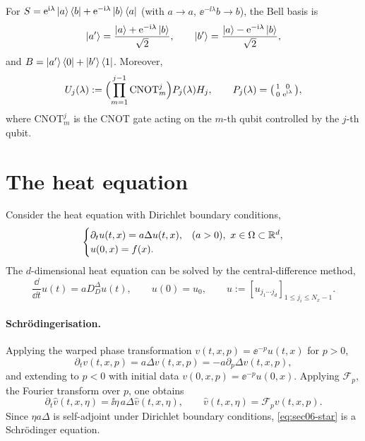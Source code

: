 \begin{remark}
For $S = \mathrm{e}^{\mathrm{i}\lambda}\ket{a}\bra{b} + \mathrm{e}^{-\mathrm{i}\lambda}\ket{b}\bra{a}$
(with $a \to a$, $\ee^{-\ii\lambda}b \to b$), the Bell basis is
\begin{equation}
  \ket{a'} = \frac{\ket{a} + \mathrm{e}^{-\mathrm{i}\lambda}\ket{b}}{\sqrt{2}}, \qquad
  \ket{b'} = \frac{\ket{a} - \mathrm{e}^{-\mathrm{i}\lambda}\ket{b}}{\sqrt{2}},
\end{equation}
and $B = \ket{a'}\bra{0} + \ket{b'}\bra{1}$. Moreover,
\begin{equation}
  U_j(\lambda) := \Bigl(\prod_{m=1}^{j-1} \mathrm{CNOT}_m^j\Bigr) P_j(\lambda) H_j, \qquad
  P_j(\lambda) = \begin{psmallmatrix} 1 & 0 \\ 0 & \mathrm{e}^{\mathrm{i}\lambda} \end{psmallmatrix},
\end{equation}
where $\mathrm{CNOT}_m^j$ is the CNOT gate acting on the $m$-th qubit controlled by
the $j$-th qubit.
\end{remark}

\section{The heat equation}\label{sec:sec06-heat}

Consider the heat equation with Dirichlet boundary conditions,
\begin{equation}
  \begin{cases}
    \partial_t u(t, x) = a\Delta u(t, x), & (a > 0),\ x \in \Omega \subset \mathbb{R}^d, \\
    u(0, x) = f(x). &
  \end{cases}
\end{equation}
The $d$-dimensional heat equation can be solved by the central-difference method,
\begin{equation}
  \frac{\dd}{\dd t} u(t) = a D_D^{\Delta} u(t), \qquad u(0) = u_0,
  \qquad u := [u_{j_1 \cdots j_d}]_{1 \le j_i \le N_x - 1}.
\end{equation}

\paragraph{Schr\"odingerisation.}
Applying the warped phase transformation $v(t, x, p) = \ee^{-p} u(t, x)$ for
$p > 0$,
\begin{equation}
  \partial_t v(t, x, p) = a\Delta v(t, x, p) = -a\partial_p \Delta v(t, x, p),
\end{equation}
and extending to $p < 0$ with initial data $v(0, x, p) = \ee^{-p} u(0, x)$.
Applying $\mathcal{F}_p$, the Fourier transform over $p$, one obtains
\begin{equation}
  \partial_t \hat{v}(t, x, \eta) = \ii\eta\, a\Delta\hat{v}(t, x, \eta),
  \qquad \hat{v}(t, x, \eta) = \mathcal{F}_p v(t, x, p).
  \label{eq:sec06-star}
\end{equation}
Since $\eta a\Delta$ is self-adjoint under Dirichlet boundary conditions,
\eqref{eq:sec06-star} is a Schr\"odinger equation.

